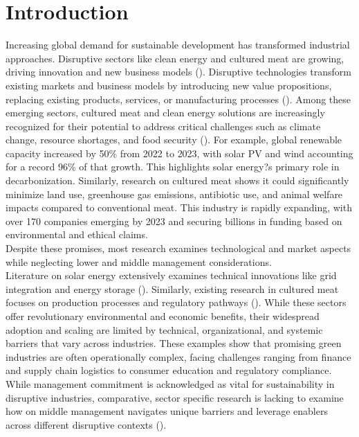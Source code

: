 
\section{Introduction}

Increasing global demand for sustainable development has transformed industrial approaches. Disruptive sectors like clean energy and cultured meat are growing, driving innovation and new business models (\textcite{SeedBlink2025, Deloitte2025}). Disruptive technologies transform existing markets and business models by introducing new value propositions, replacing existing products, services, or manufacturing processes (\textcite{Bower1995}). Among these emerging sectors, cultured meat and clean energy solutions are increasingly recognized for their potential to address critical challenges such as climate change, resource shortages, and food security (\textcite{Wageningen2022, GFI2025future}). For example, global renewable capacity increased by 50\% from 2022 to 2023, with solar PV and wind accounting for a record 96\% of that growth. This highlights solar energy?s primary role in decarbonization. Similarly, research on cultured meat shows it could significantly minimize land use, greenhouse gas emissions, antibiotic use, and animal welfare impacts compared to conventional meat. This industry is rapidly expanding, with over 170 companies emerging by 2023 and securing billions in funding based on environmental and ethical claims. \\

Despite these promises, most research examines technological and market aspects while neglecting lower and middle management considerations. \\

Literature on solar energy extensively examines technical innovations like grid integration and energy storage (\textcite{SINSEL20202271}). Similarly, existing research in cultured meat focuses on production processes and regulatory pathways (\textcite{Bryant2020}). While these sectors offer revolutionary environmental and economic benefits, their widespread adoption and scaling are limited by technical, organizational, and systemic barriers that vary across industries. These examples show that promising green industries are often operationally complex, facing challenges ranging from finance and supply chain logistics to consumer education and regulatory compliance. \\

While management commitment is acknowledged as vital for sustainability in disruptive industries, comparative, sector specific research is lacking to examine how on middle management navigates unique barriers and leverage enablers across different disruptive contexts (\textcite{Lozano2015, Egri2000}). \\

